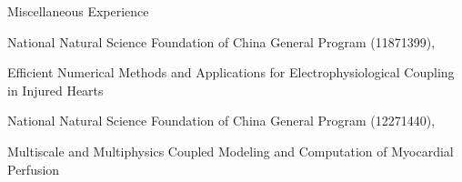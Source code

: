 \begin{rubric}{Miscellaneous Experience}



\entry*[2019.1--2022.12] National Natural Science Foundation of China General Program (11871399), \par
          Efficient Numerical Methods and Applications for Electrophysiological Coupling in Injured Hearts \par
\entry*[2023.1--2026.12] National Natural Science Foundation of China General Program (12271440), \par
          Multiscale and Multiphysics Coupled Modeling and Computation of Myocardial Perfusion \par




\end{rubric}